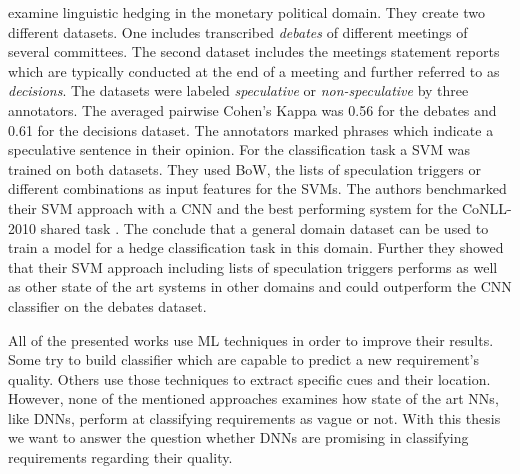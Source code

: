 \textcite{Stajner:2017} examine linguistic hedging in the monetary political domain.
They create two different datasets.
One includes transcribed \textit{debates} of different meetings of several committees.
The second dataset includes the meetings statement reports which are typically conducted at the end of a meeting and further referred to as \textit{decisions}.
The datasets were labeled \textit{speculative} or \textit{non-speculative} by three annotators.
The averaged pairwise Cohen's Kappa \parencite{Cohen:1960} was 0.56 for the debates and 0.61 for the decisions dataset.
The annotators marked phrases which indicate a speculative sentence in their opinion.
For the classification task a \ac{SVM} was trained on both datasets.
They used \ac{BoW}, the lists of speculation triggers or different combinations as input features for the \acp{SVM}.
The authors benchmarked their \ac{SVM} approach with a \ac{CNN} and the best performing system for the CoNLL-2010 shared task \parencite{Farkas:2010}.
The conclude that a general domain dataset can be used to train a model for a hedge classification task in this domain.
Further they showed that their \ac{SVM} approach including lists of speculation triggers performs as well as other state of the art systems in other domains and could outperform the \ac{CNN} classifier on the debates dataset.

All of the presented works use \ac{ML} techniques in order to improve their results.
Some try to build classifier which are capable to predict a new requirement's quality.
Others use those techniques to extract specific cues and their location.
However, none of the mentioned approaches examines how state of the art \acp{NN}, like \acp{DNN}, perform at classifying requirements as vague or not.
With this thesis we want to answer the question whether \acp{DNN} are promising in classifying requirements regarding their quality.
